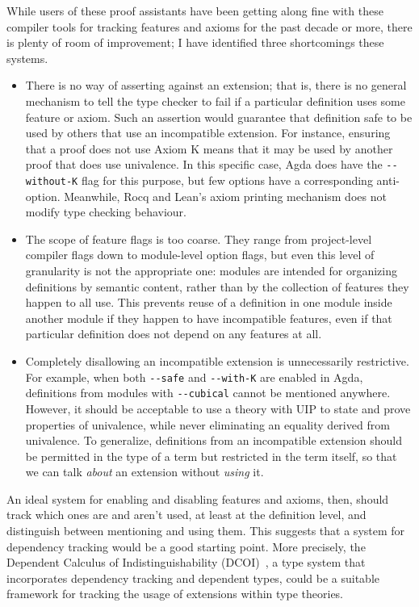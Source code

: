 \documentclass{article}
\newcommand{\code}[1]{\texttt{#1}}
\begin{document}
While users of these proof assistants have been getting along fine
with these compiler tools for tracking features and axioms for the past decade or more,
there is plenty of room of improvement;
I have identified three shortcomings these systems.
%
\begin{itemize}
  \item There is no way of asserting against an extension;
    that is, there is no general mechanism to tell the type checker to fail
    if a particular definition uses some feature or axiom.
    Such an assertion would guarantee that definition safe to be used by others
    that use an incompatible extension.
    For instance, ensuring that a proof does not use Axiom K
    means that it may be used by another proof that does use univalence.
    In this specific case, Agda does have the \code{-{}-without-K} flag for this purpose,
    but few options have a corresponding anti-option.
    Meanwhile, Rocq and Lean's axiom printing mechanism
    does not modify type checking behaviour.
  \item The scope of feature flags is too coarse.
    They range from project-level compiler flags
    down to module-level option flags,
    but even this level of granularity is not the appropriate one:
    modules are intended for organizing definitions by semantic content,
    rather than by the collection of features they happen to all use.
    This prevents reuse of a definition in one module inside another module
    if they happen to have incompatible features,
    even if that particular definition does not depend on any features at all.
  \item Completely disallowing an incompatible extension is unnecessarily restrictive.
    For example, when both \code{-{}-safe} and \code{-{}-with-K} are enabled in Agda,
    definitions from modules with \code{-{}-cubical} cannot be mentioned anywhere.
    However, it should be acceptable to use a theory with UIP
    to state and prove properties of univalence,
    while never eliminating an equality derived from univalence.
    To generalize, definitions from an incompatible extension
    should be permitted in the type of a term but restricted in the term itself,
    so that we can talk \emph{about} an extension without \emph{using} it.
\end{itemize}

An ideal system for enabling and disabling features and axioms, then,
should track which ones are and aren't used, at least at the definition level,
and distinguish between mentioning and using them.
This suggests that a system for dependency tracking would be a good starting point.
More precisely, the Dependent Calculus of Indistinguishability (DCOI)~\citep{dcoi},
a type system that incorporates dependency tracking and dependent types,
could be a suitable framework for tracking the usage of extensions within type theories.
\end{document}

